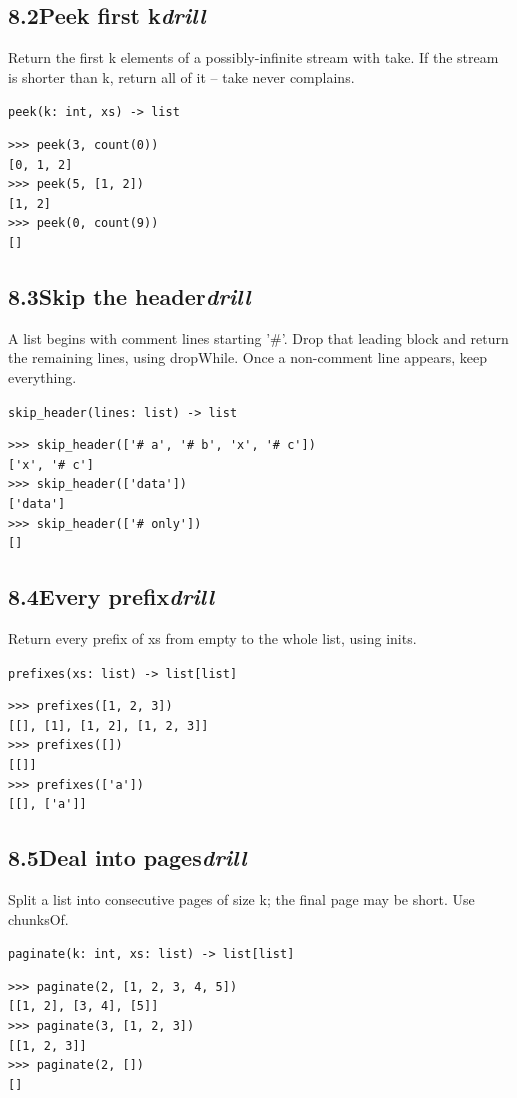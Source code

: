 \documentclass[10pt,letterpaper]{book}
\begin{document}
\subsection*{8.2\quad Peek first k\hfill\textnormal{\textit{drill}}}
Return the first k elements of a possibly-infinite stream with take. If the stream is shorter than k, return all of it -- take never complains.

\noindent\texttt{peek(k: int, xs) -> list}
\begin{lstlisting}[style=ex]
>>> peek(3, count(0))
[0, 1, 2]
>>> peek(5, [1, 2])
[1, 2]
>>> peek(0, count(9))
[]
\end{lstlisting}
\subsection*{8.3\quad Skip the header\hfill\textnormal{\textit{drill}}}
A list begins with comment lines starting '\#'. Drop that leading block and return the remaining lines, using dropWhile. Once a non-comment line appears, keep everything.

\noindent\texttt{skip\_header(lines: list) -> list}
\begin{lstlisting}[style=ex]
>>> skip_header(['# a', '# b', 'x', '# c'])
['x', '# c']
>>> skip_header(['data'])
['data']
>>> skip_header(['# only'])
[]
\end{lstlisting}

\subsection*{8.4\quad Every prefix\hfill\textnormal{\textit{drill}}}
Return every prefix of xs from empty to the whole list, using inits.

\noindent\texttt{prefixes(xs: list) -> list[list]}
\begin{lstlisting}[style=ex]
>>> prefixes([1, 2, 3])
[[], [1], [1, 2], [1, 2, 3]]
>>> prefixes([])
[[]]
>>> prefixes(['a'])
[[], ['a']]
\end{lstlisting}
\subsection*{8.5\quad Deal into pages\hfill\textnormal{\textit{drill}}}
Split a list into consecutive pages of size k; the final page may be short. Use chunksOf.

\noindent\texttt{paginate(k: int, xs: list) -> list[list]}
\begin{lstlisting}[style=ex]
>>> paginate(2, [1, 2, 3, 4, 5])
[[1, 2], [3, 4], [5]]
>>> paginate(3, [1, 2, 3])
[[1, 2, 3]]
>>> paginate(2, [])
[]
\end{lstlisting}
\end{document}
